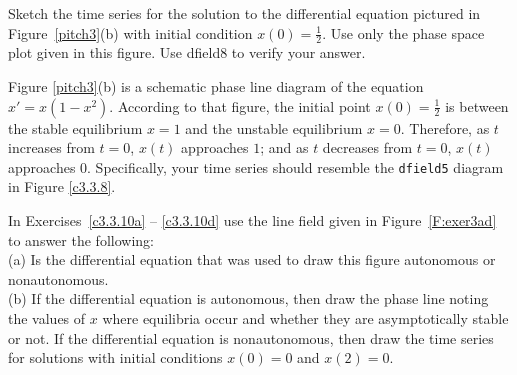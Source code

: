\documentclass{ximera}
\begin{document}
\begin{exercise} \label{c3.3.8}
Sketch the time series for the solution to the differential
equation pictured in Figure~\ref{pitch3}(b) with initial condition
$x(0)=\frac{1}{2}$.  Use only the phase space plot given in this
figure.  Use {\sf dfield8} to verify your answer.

\begin{solution}

Figure \ref{pitch3}(b) is a schematic
phase line diagram of the equation $x' = x(1 - x^2)$.  According
to that figure, the initial point $x(0) = \frac{1}{2}$ is between
the stable equilibrium $x = 1$ and the unstable equilibrium
$x = 0$.  Therefore, as $t$ increases from $t = 0$, $x(t)$
approaches $1$; and as $t$ decreases from $t = 0$, $x(t)$
approaches $0$.  Specifically, your time series should resemble
the {\tt dfield5} diagram in Figure \ref{c3.3.8}.

\begin{figure}[htb]
                       \centerline{%
                       }
\end{figure}

\end{solution}
\end{exercise}

\noindent In Exercises~\ref{c3.3.10a} -- \ref{c3.3.10d} use the line field 
given in Figure~\ref{F:exer3ad} to answer the following:\\
\noindent (a) Is the differential equation that was used to draw this figure 
autonomous or nonautonomous.\\
\noindent (b)  If the differential equation is autonomous, then draw the phase
line noting the values of $x$ where equilibria occur and whether they are 
asymptotically stable or not. If the differential equation is nonautonomous, 
then draw the time series for solutions with initial conditions $x(0)=0$ and 
$x(2)=0$.
\end{document}
